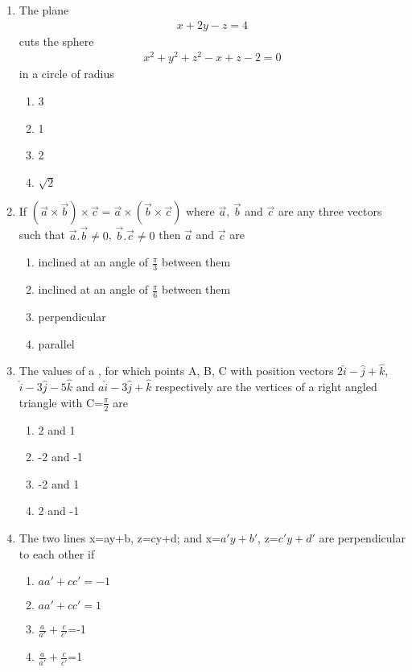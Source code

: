 \begin{enumerate}[label=\arabic*.,ref=\thesubsection.\theenumi]
\item The plane 
\begin{align*}
x+2y-z=4
\end{align*}
cuts the sphere
\begin{align}
x^2+y^2+z^2-x+z-2=0
\end{align}
in a circle of radius
\begin{enumerate}
\item 3
\item 1
\item 2
\item $\sqrt{2}$
\end{enumerate}

\item If $(\overrightarrow{a} \times \overrightarrow{b}) \times \overrightarrow{c}=\overrightarrow{a} \times (\overrightarrow{b} \times \overrightarrow{c})$ where $\overrightarrow{a}$, $\overrightarrow{b}$ and $\overrightarrow{c}$ are any three vectors such that $\overrightarrow{a}.\overrightarrow{b} \neq 0$, $\overrightarrow{b}.\overrightarrow{c} \neq 0$ then $\overrightarrow{a}$ and $\overrightarrow{c}$ are
\begin{enumerate}
\item inclined at an angle of $\frac{\pi}{3}$ between them
\item inclined at an angle of $\frac{\pi}{6}$ between them
\item perpendicular
\item parallel
\end{enumerate}

\item The values of a , for which points A, B, C with position vectors $2\hat{i}-\hat{j}+\hat{k}$, $\hat{i}-3\hat{j}-5\hat{k}$ and $a\hat{i}-3\hat{j}+\hat{k}$ respectively are the vertices of a right angled triangle with C=$\frac{\pi}{2}$ are
\begin{enumerate}
\item 2 and 1
\item -2 and -1
\item -2 and 1
\item 2 and -1
\end{enumerate}

\item The two lines x=ay+b, z=cy+d; and x=$a'y+b'$, z=$c'y+d'$ are perpendicular to each other if
\begin{enumerate}
\item $aa'+cc'=-1$
\item $aa'+cc'=1$
\item $\frac{a}{a'}+\frac{c}{c'}$=-1
\item $\frac{a}{a'}+\frac{c}{c'}$=1
\end{enumerate}


\end{enumerate}
